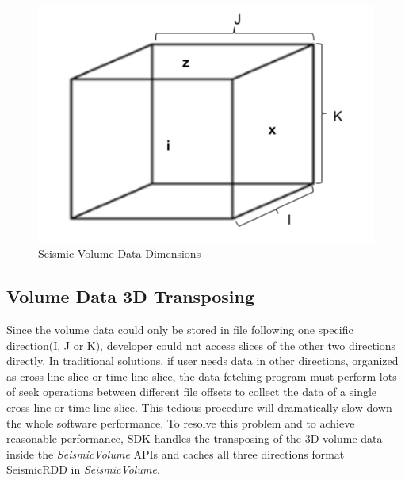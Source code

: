 \begin{figure}[h]
\centering
\includegraphics[scale=0.6]{figures/VolumeDim.png}
\caption{Seismic Volume Data Dimensions}
\label{VolumeDim}
\end{figure}


\subsection{Volume Data 3D Transposing}

Since the volume data could only be stored in file following one specific direction(I, J or K), developer could not access slices of the other two directions directly. In traditional solutions, if user needs data in other directions, organized as cross-line slice or time-line slice, the data fetching program must perform lots of seek operations between different file offsets to collect the data of a single cross-line or time-line slice. This tedious procedure will dramatically slow down the whole software performance. To resolve this problem and to achieve reasonable performance, SDK handles the transposing of the 3D volume data inside the \emph{SeismicVolume} APIs and caches all three directions format SeismicRDD in \emph{SeismicVolume}.

